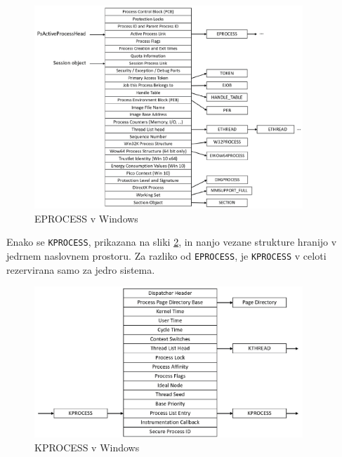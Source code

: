 \documentclass[a4paper,12pt,openright]{book}
\begin{document}
\begin{figure}[h!]
	\begin{center}
		\includegraphics[width=0.9\textwidth]{images/windows_eprocess.png}
	\end{center}
	\caption{EPROCESS v Windows \cite{Yosifovich_Russinovich_Solomon_Ionescu_2017}}
	\label{fig:windows_eprocess}
\end{figure}

Enako se \texttt{KPROCESS}, prikazana na sliki \ref{fig:windows_kprocess}, in nanjo vezane strukture hranijo v jedrnem naslovnem prostoru.
Za razliko od \texttt{EPROCESS}, je \texttt{KPROCESS} v celoti rezervirana samo za jedro sistema.

\begin{figure}[h!]
	\begin{center}
		\includegraphics[width=0.9\textwidth]{images/windows_kprocess.png}
	\end{center}
	\caption{KPROCESS v Windows \cite{Yosifovich_Russinovich_Solomon_Ionescu_2017}}
	\label{fig:windows_kprocess}
\end{figure}
\end{document}
